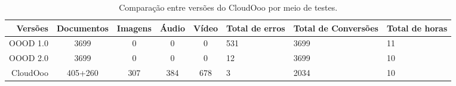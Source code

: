 \begin{table}[!t]
\caption{Comparação entre versões do CloudOoo por meio de testes.}
\label{clooo}
\begin{tabular}{|r|c|c|c|c|p{1.5cm}|p{2cm}|p{1.5cm}|}
\hline
Versões & Documentos & Imagens & Áudio & Vídeo & Total de erros & Total de Conversões & Total de horas \\
\hline
OOOD 1.0 & 3699 & 0 & 0 & 0 & 531 & 3699 & 11 \\
\hline
OOOD 2.0 & 3699 & 0 & 0 & 0 & 12 & 3699 & 10 \\
\hline
CloudOoo & 405+260 & 307 & 384 & 678 & 3 & 2034 & 10 \\
\hline
\end{tabular} 
\end{table}


